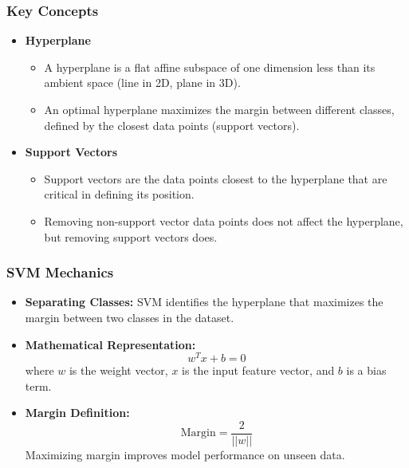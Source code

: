 \documentclass[aspectratio=169]{beamer}
\begin{document}
\begin{frame}[fragile]
    \frametitle{Key Concepts}
    \begin{itemize}
        \item \textbf{Hyperplane}
            \begin{itemize}
                \item A hyperplane is a flat affine subspace of one dimension less than its ambient space (line in 2D, plane in 3D).
                \item An optimal hyperplane maximizes the margin between different classes, defined by the closest data points (support vectors).
            \end{itemize}
        \item \textbf{Support Vectors}
            \begin{itemize}
                \item Support vectors are the data points closest to the hyperplane that are critical in defining its position.
                \item Removing non-support vector data points does not affect the hyperplane, but removing support vectors does.
            \end{itemize}
    \end{itemize}
\end{frame}

\begin{frame}[fragile]
    \frametitle{SVM Mechanics}
    \begin{itemize}
        \item \textbf{Separating Classes:} SVM identifies the hyperplane that maximizes the margin between two classes in the dataset.
        \item \textbf{Mathematical Representation:}
            \begin{equation}
                w^T x + b = 0
            \end{equation}
            where \( w \) is the weight vector, \( x \) is the input feature vector, and \( b \) is a bias term.
        \item \textbf{Margin Definition:}
            \begin{equation}
                \text{Margin} = \frac{2}{||w||}
            \end{equation}
            Maximizing margin improves model performance on unseen data.
    \end{itemize}
\end{frame}
\end{document}
